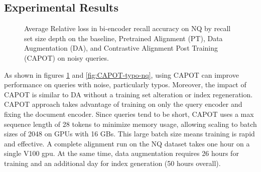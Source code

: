 \subsection{Experimental Results}
\begin{figure}[!htb]
    \centering
    \caption{Average Relative loss in bi-encoder recall accuracy on NQ by recall set size depth on the baseline, Pretrained Alignment (PT), Data Augmentation (DA), and Contrastive Alignment Post Training (CAPOT) on noisy queries.}
    \label{fig:CAPOT-all-nq}
\end{figure}
As shown in figures \ref{fig:CAPOT-all-nq} and \ref{fig:CAPOT-typo-nq}, using CAPOT can improve performance on queries with noise, particularly typos. Moreover, the impact of CAPOT is similar to DA without a training set alteration or index regeneration. CAPOT approach takes advantage of training on only the query encoder and fixing the document encoder. Since queries tend to be short, CAPOT uses a max sequence length of 28 tokens to minimize memory usage, allowing scaling to batch sizes of 2048 on GPUs with 16 GBs. This large batch size means training is rapid and effective. A complete alignment run on the NQ dataset takes one hour on a single V100 gpu. At the same time, data augmentation requires 26 hours for training and an additional day for index generation (50 hours overall).\\ 
